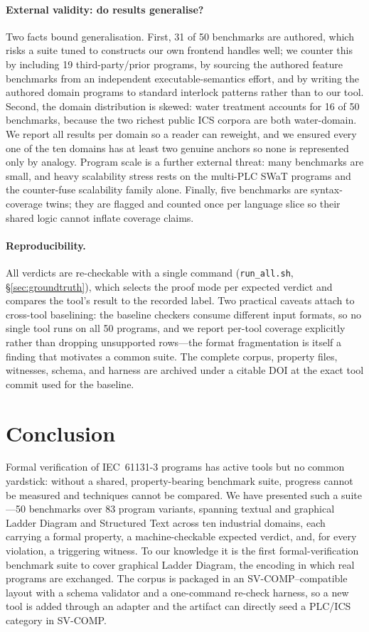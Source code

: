 \paragraph{External validity: do results generalise?}
Two facts bound generalisation. First, 31 of 50 benchmarks are authored, which risks a
suite tuned to constructs our own frontend handles well; we counter this by including 19
third-party/prior programs, by sourcing the authored feature benchmarks from an
independent executable-semantics effort, and by writing the authored domain programs to
standard interlock patterns rather than to our tool. Second, the domain distribution is
skewed: water treatment accounts for 16 of 50 benchmarks, because the two richest public
ICS corpora are both water-domain. We report all results per domain so a reader can
reweight, and we ensured every one of the ten domains has at least two genuine anchors so
none is represented only by analogy. Program scale is a further external threat: many
benchmarks are small, and heavy scalability stress rests on the multi-PLC SWaT programs
and the counter-fuse scalability family alone. Finally, five benchmarks are
syntax-coverage twins; they are flagged and counted once per language slice so their shared
logic cannot inflate coverage claims.

\paragraph{Reproducibility.}
All verdicts are re-checkable with a single command (\texttt{run\_all.sh},
\S\ref{sec:groundtruth}), which selects the proof mode per expected verdict and compares
the tool's result to the recorded label. Two practical caveats attach to cross-tool
baselining: the baseline checkers consume different input formats, so no single tool runs
on all 50 programs, and we report per-tool coverage explicitly rather than dropping
unsupported rows---the format fragmentation is itself a finding that motivates a common
suite. The complete corpus, property files, witnesses, schema, and harness are archived
under a citable DOI at the exact tool commit used for the baseline.

\section{Conclusion}
\label{sec:conclusion}

Formal verification of IEC~61131-3 programs has active tools but no common yardstick: without
a shared, property-bearing benchmark suite, progress cannot be measured and techniques cannot be
compared. We have presented such a suite---50 benchmarks over 83 program variants, spanning
textual and graphical Ladder Diagram and Structured Text across ten industrial domains, each
carrying a formal property, a machine-checkable expected verdict, and, for every violation, a
triggering witness. To our knowledge it is the first formal-verification benchmark suite to cover
graphical Ladder Diagram, the encoding in which real programs are exchanged. The corpus is
packaged in an SV-COMP--compatible layout with a schema validator and a one-command re-check
harness, so a new tool is added through an adapter and the artifact can directly seed a PLC/ICS
category in SV-COMP.

